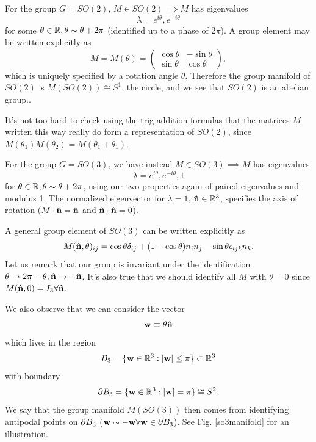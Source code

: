 \begin{exm}
For the group $G=SO(2)$, $M\in SO(2)\implies M$ has eigenvalues
$$\lambda=e^{i\theta},e^{-i\theta}$$ for some $\theta\in\mathbb{R},\theta \sim \theta+2\pi$ (identified up to a phase of $2\pi$). A group element may be written explicitly as
$$M=M(\theta)=\begin{pmatrix}
\cos\theta & -\sin\theta\\
\sin\theta & \cos\theta
\end{pmatrix},$$
which is uniquely specified by a rotation angle $\theta$. Therefore the group manifold of $SO(2)$ is $M(SO(2))\cong S^1$, the circle, and we see that $SO(2)$ is an abelian group..

It's not too hard to check using the trig addition formulas that the matrices $M$ written this way really do form a representation of $SO(2)$, since $M(\theta_1) M(\theta_2)=M(\theta_1+\theta_1)$.
\end{exm}
\begin{exm}
For the group $G=SO(3)$, we have instead $M\in SO(3)\implies M$ has eigenvalues
$$\lambda=e^{i\theta},e^{-i\theta},1$$ for $\theta\in \mathbb{R},\theta \sim \theta+2\pi$, using our two properties again of paired eigenvalues and modulus 1.
The normalized eigenvector for $\lambda=1$, $\mathbf{\hat{n}} \in \mathbb{R}^3$, specifies the axis of rotation ($M \cdot \mathbf{\hat{n}} = \mathbf{\hat{n}}$ and $\mathbf{\hat{n}} \cdot \mathbf{\hat{n}} = 0$).

A general group element of $SO(3)$ can be written explicitly as
\begin{equation}
M(\mathbf{\hat{n}}, \theta)_{ij} = \cos\theta\delta_{ij} +(1-\cos\theta)n_i n_j - \sin\theta \epsilon_{ijk} n_k.
\end{equation}
Let us remark that our group is invariant under the identification $\theta\to 2\pi-\theta, \mathbf{\hat{n}} \to -\mathbf{\hat{n}}$. It's also true that we should identify all $M$ with $\theta=0$ since $M(\mathbf{\hat{n}}, 0)= I_3 \forall \mathbf{\hat{n}}$.

We also observe that we can consider the vector
$$\boldsymbol{\mathbf{w}}\equiv\theta \mathbf{\hat{n}}$$ which lives in the region
$$B_3=\{\boldsymbol{\mathbf{w}}\in \mathbb{R}^3: |\boldsymbol{\mathbf{w}}|\leq \pi\} \subset \mathbb{R}^3$$
with boundary
$$\partial B_3 = \{\boldsymbol{\mathbf{w}}\in \mathbb{R}^3: |\boldsymbol{\mathbf{w}}|=\pi\} \cong S^2.$$
We say that the group manifold $M(SO(3))$ then comes from identifying antipodal points on $\partial B_3$ ($\boldsymbol{\mathbf{w}} \sim -\boldsymbol{\mathbf{w}} \forall \boldsymbol{\mathbf{w}} \in \partial B_3$). See Fig. \ref{so3manifold} for an illustration.
\end{exm}

